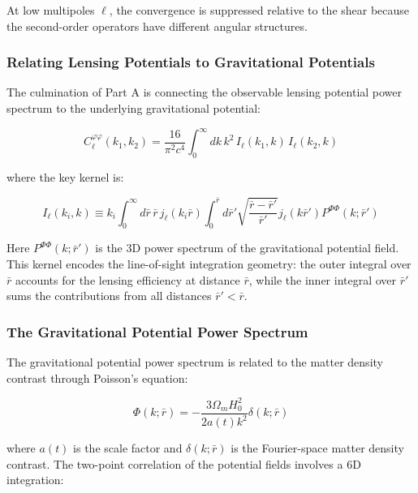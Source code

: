 At low multipoles $\ell$, the convergence is suppressed relative to the shear because the second-order operators have different angular structures.

\subsubsection{Relating Lensing Potentials to Gravitational Potentials}

The culmination of Part A is connecting the observable lensing potential power spectrum to the underlying gravitational potential:

\begin{equation}
C_\ell^{\varphi\varphi}(k_1, k_2) = \frac{16}{\pi^2 c^4} \int_0^\infty dk \, k^2 \, I_\ell(k_1, k) \, I_\ell(k_2, k)
\label{eq:lensing_potential_from_gravity}
\end{equation}

where the key kernel is:

\begin{equation}
I_\ell(k_i, k) \equiv k_i \int_0^\infty d\bar{r} \, \bar{r} \, j_\ell(k_i \bar{r}) \int_0^{\bar{r}} d\bar{r}' \sqrt{\frac{\bar{r} - \bar{r}'}{\bar{r}'}} j_\ell(k \bar{r}') P^{\Phi\Phi}(k; \bar{r}')
\label{eq:gravity_kernel}
\end{equation}

Here $P^{\Phi\Phi}(k; \bar{r}')$ is the 3D power spectrum of the gravitational potential field. This kernel encodes the line-of-sight integration geometry: the outer integral over $\bar{r}$ accounts for the lensing efficiency at distance $\bar{r}$, while the inner integral over $\bar{r}'$ sums the contributions from all distances $\bar{r}' < \bar{r}$.

\subsubsection{The Gravitational Potential Power Spectrum}

The gravitational potential power spectrum is related to the matter density contrast through Poisson's equation:

\begin{equation}
\Phi(k; \bar{r}) = -\frac{3\Omega_m H_0^2}{2a(t) k^2} \delta(k; \bar{r})
\label{eq:poisson_equation}
\end{equation}

where $a(t)$ is the scale factor and $\delta(k; \bar{r})$ is the Fourier-space matter density contrast. The two-point correlation of the potential fields involves a 6D integration:

